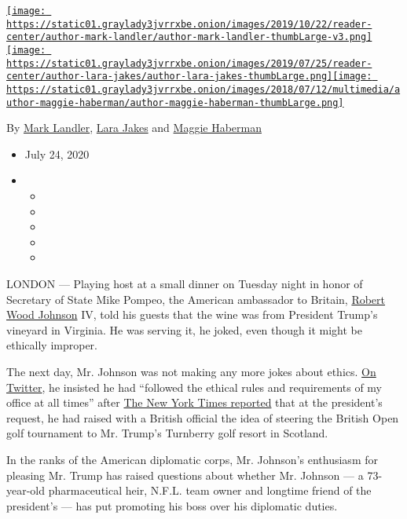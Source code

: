 \href{https://www.nytimes3xbfgragh.onion/by/mark-landler}{\texttt{[image: https://static01.graylady3jvrrxbe.onion/images/2019/10/22/reader-center/author-mark-landler/author-mark-landler-thumbLarge-v3.png]}}\href{https://www.nytimes3xbfgragh.onion/by/lara-jakes}{\texttt{[image: https://static01.graylady3jvrrxbe.onion/images/2019/07/25/reader-center/author-lara-jakes/author-lara-jakes-thumbLarge.png]}}\href{https://www.nytimes3xbfgragh.onion/by/maggie-haberman}{\texttt{[image: https://static01.graylady3jvrrxbe.onion/images/2018/07/12/multimedia/author-maggie-haberman/author-maggie-haberman-thumbLarge.png]}}

By \href{https://www.nytimes3xbfgragh.onion/by/mark-landler}{Mark
Landler}, \href{https://www.nytimes3xbfgragh.onion/by/lara-jakes}{Lara
Jakes} and
\href{https://www.nytimes3xbfgragh.onion/by/maggie-haberman}{Maggie
Haberman}

\begin{itemize}
\item
  July 24, 2020
\item
  \begin{itemize}
  \item
  \item
  \item
  \item
  \item
  \end{itemize}
\end{itemize}

LONDON --- Playing host at a small dinner on Tuesday night in honor of
Secretary of State Mike Pompeo, the American ambassador to Britain,
\href{https://www.nytimes3xbfgragh.onion/2020/07/25/sports/football/woody-johnson-trump-jets.html}{Robert
Wood Johnson} IV, told his guests that the wine was from President
Trump's vineyard in Virginia. He was serving it, he joked, even though
it might be ethically improper.

The next day, Mr. Johnson was not making any more jokes about ethics.
\href{https://twitter.com/USAmbUK/status/1286029006500966402?s=20}{On
Twitter}, he insisted he had ``followed the ethical rules and
requirements of my office at all times'' after
\href{https://www.nytimes3xbfgragh.onion/2020/07/21/world/europe/trump-british-open.html}{The
New York Times reported} that at the president's request, he had raised
with a British official the idea of steering the British Open golf
tournament to Mr. Trump's Turnberry golf resort in Scotland.

In the ranks of the American diplomatic corps, Mr. Johnson's enthusiasm
for pleasing Mr. Trump has raised questions about whether Mr. Johnson
--- a 73-year-old pharmaceutical heir, N.F.L. team owner and longtime
friend of the president's --- has put promoting his boss over his
diplomatic duties.

